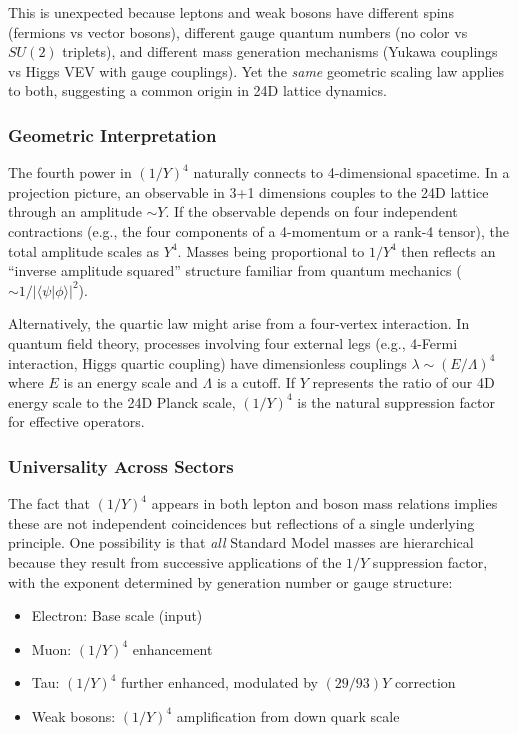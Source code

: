 \documentclass[11pt,a4paper]{article}
\begin{document}
This is unexpected because leptons and weak bosons have different spins (fermions vs vector bosons), different gauge quantum numbers (no color vs $SU(2)$ triplets), and different mass generation mechanisms (Yukawa couplings vs Higgs VEV with gauge couplings). Yet the \emph{same} geometric scaling law applies to both, suggesting a common origin in 24D lattice dynamics.

\subsubsection{Geometric Interpretation}

The fourth power in $(1/Y)^4$ naturally connects to 4-dimensional spacetime. In a projection picture, an observable in 3+1 dimensions couples to the 24D lattice through an amplitude $\sim Y$. If the observable depends on four independent contractions (e.g., the four components of a 4-momentum or a rank-4 tensor), the total amplitude scales as $Y^4$. Masses being proportional to $1/Y^4$ then reflects an ``inverse amplitude squared'' structure familiar from quantum mechanics ($\sim 1/|\langle \psi | \phi \rangle|^2$).

Alternatively, the quartic law might arise from a four-vertex interaction. In quantum field theory, processes involving four external legs (e.g., 4-Fermi interaction, Higgs quartic coupling) have dimensionless couplings $\lambda \sim (E/\Lambda)^4$ where $E$ is an energy scale and $\Lambda$ is a cutoff. If $Y$ represents the ratio of our 4D energy scale to the 24D Planck scale, $(1/Y)^4$ is the natural suppression factor for effective operators.

\subsubsection{Universality Across Sectors}

The fact that $(1/Y)^4$ appears in both lepton and boson mass relations implies these are not independent coincidences but reflections of a single underlying principle. One possibility is that \emph{all} Standard Model masses are hierarchical because they result from successive applications of the $1/Y$ suppression factor, with the exponent determined by generation number or gauge structure:
\begin{itemize}
\item Electron: Base scale (input)
\item Muon: $(1/Y)^4$ enhancement
\item Tau: $(1/Y)^4$ further enhanced, modulated by $(29/93) Y$ correction
\item Weak bosons: $(1/Y)^4$ amplification from down quark scale
\end{itemize}
\end{document}
